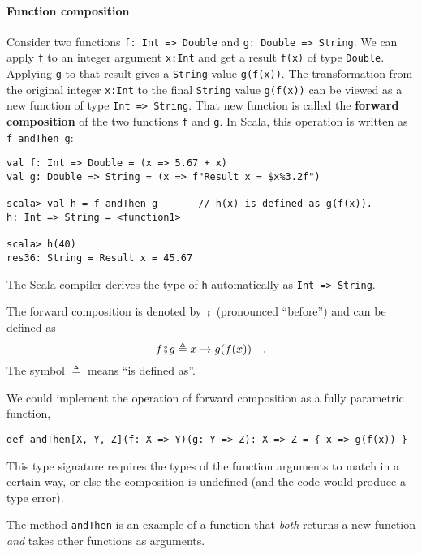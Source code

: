 \paragraph{Function composition}

Consider two functions \lstinline!f: Int => Double!
and \lstinline!g: Double => String!. We can apply \lstinline!f!
to an integer argument \lstinline!x:Int! and get a result \lstinline!f(x)!
of type \lstinline!Double!. Applying \lstinline!g! to that result
gives a \lstinline!String! value \lstinline!g(f(x))!. The transformation
from the original integer \lstinline!x:Int! to the final \lstinline!String!
value \lstinline!g(f(x))! can be viewed as a new function of type
\lstinline!Int => String!. That new function is called the \textbf{forward
composition} of the two functions \lstinline!f!
and \lstinline!g!. In Scala, this operation is written as \lstinline!f andThen g!:
\begin{lstlisting}
val f: Int => Double = (x => 5.67 + x)
val g: Double => String = (x => f"Result x = $x%3.2f")

scala> val h = f andThen g       // h(x) is defined as g(f(x)).
h: Int => String = <function1>

scala> h(40)
res36: String = Result x = 45.67
\end{lstlisting}
The Scala compiler derives the type of \lstinline!h! automatically
as \lstinline!Int => String!.

The forward composition is denoted by $\bef$ (pronounced \textsf{``}before\textsf{''})
and can be defined as
\begin{equation}
f\bef g\triangleq x\rightarrow g(f(x))\quad.\label{eq:def-of-forward-composition}
\end{equation}
The symbol $\triangleq$ means \textsf{``}is defined as\textsf{''}.

We could implement the operation of forward composition as a fully
parametric function,
\begin{lstlisting}
def andThen[X, Y, Z](f: X => Y)(g: Y => Z): X => Z = { x => g(f(x)) }
\end{lstlisting}
This type signature requires the types of the function arguments to
match in a certain way, or else the composition is undefined (and
the code would produce a type error).

The method \lstinline!andThen! is an example of a function that \emph{both}
returns a new function \emph{and} takes other functions as arguments.

